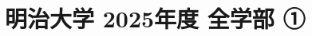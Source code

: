 \documentclass[../../uem_mat_mei_q.tex]{subfiles}
\begin{document}
    \section{明治大学 2025年度 全学部 ①}
    \subsection{　}
        
        \clearpage
    \subsection{　}
        
        \clearpage
    \subsection{　}
        
\end{document}
